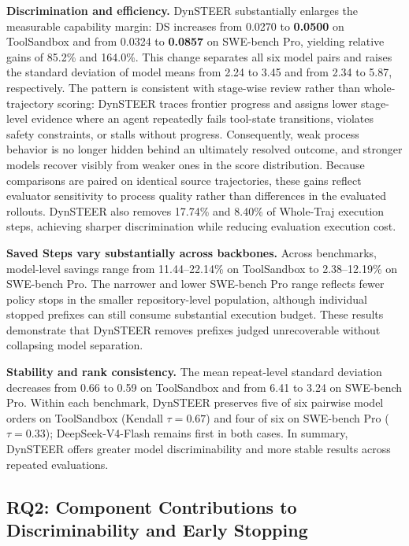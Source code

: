 \textbf{Discrimination and efficiency.} DynSTEER substantially enlarges the measurable capability margin: DS increases from 0.0270 to \textbf{0.0500} on ToolSandbox and from 0.0324 to \textbf{0.0857} on SWE-bench Pro, yielding relative gains of 85.2\% and 164.0\%. 
This change separates all six model pairs and raises the standard deviation of model means from 2.24 to 3.45 and from 2.34 to 5.87, respectively.  
The pattern is consistent with stage-wise review rather than whole-trajectory scoring: DynSTEER traces frontier progress and assigns lower stage-level evidence where an agent repeatedly fails tool-state transitions, violates safety constraints, or stalls without progress. 
Consequently, weak process behavior is no longer hidden behind an ultimately resolved outcome, and stronger models recover visibly from weaker ones in the score distribution.
Because comparisons are paired on identical source trajectories, these gains reflect evaluator sensitivity to process quality rather than differences in the evaluated rollouts. 
DynSTEER also removes 17.74\% and 8.40\% of Whole-Traj execution steps, achieving sharper discrimination while reducing evaluation execution cost.

\textbf{Saved Steps vary substantially across backbones.} 
Across benchmarks, model-level savings range from 11.44--22.14\% on ToolSandbox to 2.38--12.19\% on SWE-bench Pro. 
The narrower and lower SWE-bench Pro range reflects fewer policy stops in the smaller repository-level population, although individual stopped prefixes can still consume substantial execution budget.
These results demonstrate that DynSTEER removes prefixes judged unrecoverable without collapsing model separation.

\textbf{Stability and rank consistency.} The mean repeat-level standard deviation decreases from 0.66 to 0.59 on ToolSandbox and from 6.41 to 3.24 on SWE-bench Pro. 
Within each benchmark, DynSTEER preserves five of six pairwise model orders on ToolSandbox (Kendall $\tau=0.67$) and four of six on SWE-bench Pro ($\tau=0.33$); DeepSeek-V4-Flash remains first in both cases. 
In summary, DynSTEER offers greater model discriminability and more stable results across repeated evaluations.

\subsection{RQ2: Component Contributions to Discriminability and Early Stopping}
\label{sec:exp_rq2}

